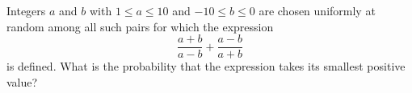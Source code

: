 Integers $a$ and $b$ with $1\le a\le10$ and $-10\le b\le0$ are chosen uniformly at random among all such pairs for which the expression
\[
\dfrac{a+b}{a-b}+\dfrac{a-b}{a+b}
\]
is defined. What is the probability that the expression takes its smallest positive value?
